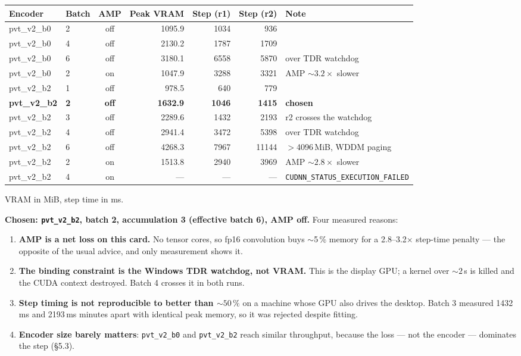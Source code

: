 \documentclass[11pt,a4paper]{article}
\newcommand{\code}[1]{\texttt{\small #1}}
\begin{document}
\begin{center}
\begin{tabular}{@{}llcrrrl@{}}
\toprule
\textbf{Encoder} & \textbf{Batch} & \textbf{AMP} & \textbf{Peak VRAM} &
\textbf{Step (r1)} & \textbf{Step (r2)} & \textbf{Note} \\
\midrule
pvt\_v2\_b0 & 2 & off & 1095.9 & 1034 & 936 & \\
pvt\_v2\_b0 & 4 & off & 2130.2 & 1787 & 1709 & \\
pvt\_v2\_b0 & 6 & off & 3180.1 & 6558 & 5870 & over TDR watchdog \\
pvt\_v2\_b0 & 2 & on & 1047.9 & 3288 & 3321 & AMP $\sim3.2\times$ slower \\
pvt\_v2\_b2 & 1 & off & 978.5 & 640 & 779 & \\
\textbf{pvt\_v2\_b2} & \textbf{2} & \textbf{off} & \textbf{1632.9} &
  \textbf{1046} & \textbf{1415} & \textbf{chosen} \\
pvt\_v2\_b2 & 3 & off & 2289.6 & 1432 & 2193 & r2 crosses the watchdog \\
pvt\_v2\_b2 & 4 & off & 2941.4 & 3472 & 5398 & over TDR watchdog \\
pvt\_v2\_b2 & 6 & off & 4268.3 & 7967 & 11144 & $>$4096\,MiB, WDDM paging \\
pvt\_v2\_b2 & 2 & on & 1513.8 & 2940 & 3969 & AMP $\sim2.8\times$ slower \\
pvt\_v2\_b2 & 4 & on & --- & --- & --- & \code{CUDNN\_STATUS\_EXECUTION\_FAILED} \\
\bottomrule
\end{tabular}
\end{center}
{\small VRAM in MiB, step time in ms.}

\textbf{Chosen: \code{pvt\_v2\_b2}, batch 2, accumulation 3 (effective batch 6),
AMP off.} Four measured reasons:

\begin{enumerate}
\item \textbf{AMP is a net loss on this card.} No tensor cores, so fp16
convolution buys $\sim$5\,\% memory for a 2.8--3.2$\times$ step-time penalty ---
the opposite of the usual advice, and only measurement shows it.
\item \textbf{The binding constraint is the Windows TDR watchdog, not VRAM.}
This is the display GPU; a kernel over ${\sim}2$\,s is killed and the CUDA
context destroyed. Batch 4 crosses it in both runs.
\item \textbf{Step timing is not reproducible to better than ${\sim}50\,\%$} on
a machine whose GPU also drives the desktop. Batch 3 measured 1432\,ms and
2193\,ms minutes apart with identical peak memory, so it was rejected despite
fitting.
\item \textbf{Encoder size barely matters}: \code{pvt\_v2\_b0} and
\code{pvt\_v2\_b2} reach similar throughput, because the loss --- not the
encoder --- dominates the step (\S5.3).
\end{enumerate}
\end{document}
